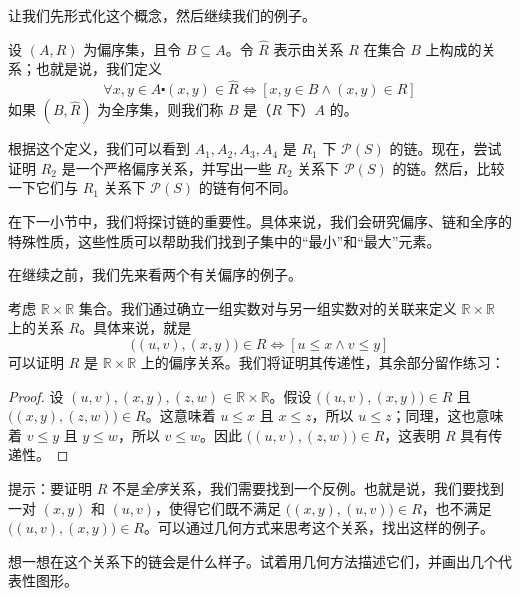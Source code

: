 让我们先形式化这个概念，然后继续我们的例子。\\

\begin{definition}
    设 $(A, R)$ 为偏序集，且令 $B \subseteq A$。令 $\hat{R}$ 表示由关系 $R$ 在集合 $B$ 上构成的关系；也就是说，我们定义
    \[\forall x, y \in A \centerdot (x, y) \in \hat{R} \iff [x, y \in B \land (x, y) \in R]\]
    如果 $(B, \hat{R})$ 为全序集，则我们称 $B$ 是（$R$ 下）$A$ 的。
\end{definition}

根据这个定义，我们可以看到 $A_1, A_2, A_3, A_4$ 是 $R_1$ 下 $\mathcal{P}(S)$ 的链。现在，尝试证明 $R_2$ 是一个严格偏序关系，并写出一些 $R_2$ 关系下 $\mathcal{P}(S)$ 的链。然后，比较一下它们与 $R_1$ 关系下 $\mathcal{P}(S)$ 的链有何不同。

在下一小节中，我们将探讨链的重要性。具体来说，我们会研究偏序、链和全序的特殊性质，这些性质可以帮助我们找到子集中的``最小''和``最大''元素。

在继续之前，我们先来看两个有关偏序的例子。\\

\begin{example}
    考虑 $\mathbb{R} \times \mathbb{R}$ 集合。我们通过确立一组实数对与另一组实数对的关联来定义 $\mathbb{R} \times \mathbb{R}$ 上的关系 $R$。具体来说，就是
    \[\big((u, v),(x, y)\big) \in R \iff [u \le x \land v \le y]\]
    可以证明 $R$ 是 $\mathbb{R} \times \mathbb{R}$ 上的偏序关系。我们将证明其传递性，其余部分留作练习：
\end{example}

\begin{proof}
    设 $(u, v),(x, y),(z, w) \in \mathbb{R} \times \mathbb{R}$。假设 $\big((u, v),(x, y)\big) \in R$ 且 $\big((x, y),(z, w)\big) \in R$。这意味着 $u \le x$ 且 $x \le z$，所以 $u \le z$；同理，这也意味着 $v \le y$ 且 $y \le w$，所以 $v \le w$。因此 $\big((u, v),(z, w)\big) \in R$，这表明 $R$ 具有传递性。
\end{proof}

提示：要证明 $R$ 不是\emph{全序}关系，我们需要找到一个反例。也就是说，我们要找到一对 $(x, y)$ 和 $(u, v)$，使得它们既不满足 $\big((x, y),(u, v)\big) \in R$，也不满足 $\big((u, v),(x, y)\big) \in R$。可以通过几何方式来思考这个关系，找出这样的例子。

想一想在这个关系下的链会是什么样子。试着用几何方法描述它们，并画出几个代表性图形。\\


